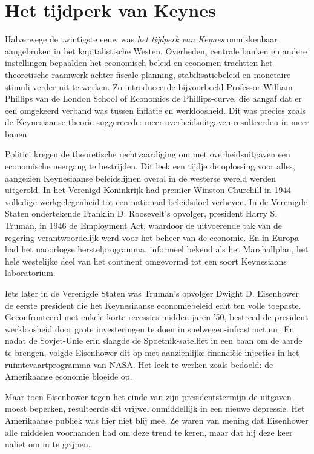 \documentclass[
  a5paper,
  smalldemyvopaper,11pt,twoside,onecolumn,openright,extrafontsizes,
hidelinks]{memoir}
\begin{document}
\section{Het tijdperk van Keynes}\label{het-tijdperk-van-keynes}

Halverwege de twintigste eeuw was \emph{het tijdperk van Keynes}
onmiskenbaar aangebroken in het kapitalistische Westen. Overheden,
centrale banken en andere instellingen bepaalden het economisch beleid
en economen trachtten het theoretische raamwerk achter fiscale planning,
stabilisatiebeleid en monetaire stimuli verder uit te werken. Zo
introduceerde bijvoorbeeld Professor William Phillips van de London
School of Economics de Phillips-curve, die aangaf dat er een omgekeerd
verband was tussen inflatie en werkloosheid. Dit was precies zoals de
Keynesiaanse theorie suggereerde: meer overheidsuitgaven resulteerden in
meer banen.

Politici kregen de theoretische rechtvaardiging om met overheidsuitgaven
een economische neergang te bestrijden. Dit leek een tijdje de oplossing
voor alles, aangezien Keynesiaanse beleidslijnen overal in de westerse
wereld werden uitgerold. In het Verenigd Koninkrijk had premier Winston
Churchill in 1944 volledige werkgelegenheid tot een nationaal
beleidsdoel verheven. In de Verenigde Staten ondertekende Franklin D.
Roosevelt's opvolger, president Harry S. Truman, in 1946 de Employment
Act, waardoor de uitvoerende tak van de regering verantwoordelijk werd
voor het beheer van de economie. En in Europa had het naoorlogse
herstelprogramma, informeel bekend als het Marshallplan, het hele
westelijke deel van het continent omgevormd tot een soort Keynesiaans
laboratorium.

Iets later in de Verenigde Staten was Truman's opvolger Dwight D.
Eisenhower de eerste president die het Keynesiaanse economiebeleid echt
ten volle toepaste. Geconfronteerd met enkele korte recessies midden
jaren '50, bestreed de president werkloosheid door grote investeringen
te doen in snelwegen-infrastructuur. En nadat de Sovjet-Unie erin
slaagde de Spoetnik-satelliet in een baan om de aarde te brengen, volgde
Eisenhower dit op met aanzienlijke financiële injecties in het
ruimtevaartprogramma van NASA. Het leek te werken zoals bedoeld: de
Amerikaanse economie bloeide op.

Maar toen Eisenhower tegen het einde van zijn presidentstermijn de
uitgaven moest beperken, resulteerde dit vrijwel onmiddellijk in een
nieuwe depressie. Het Amerikaanse publiek was hier niet blij mee. Ze
waren van mening dat Eisenhower alle middelen voorhanden had om deze
trend te keren, maar dat hij deze keer naliet om in te grijpen.
\end{document}
